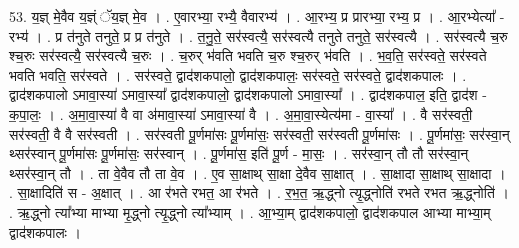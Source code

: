 \documentclass[17pt]{extarticle}
\begin{document}
53. य॒ज्ञ् मे॒वैव य॒ज्ञ्ं ॅय॒ज्ञ् मे॒व । . ए॒वारभ्या॒ रभ्यै॒ वैवारभ्य॑ । . आ॒रभ्य॒ प्र प्रारभ्या॒ रभ्य॒ प्र । . आ॒रभ्येत्या᳚ - रभ्य॑ । . प्र त॑नुते तनुते॒ प्र प्र त॑नुते । . त॒नु॒ते॒ सर॑स्वत्यै॒ सर॑स्वत्यै तनुते तनुते॒ सर॑स्वत्यै । . सर॑स्वत्यै च॒रु श्च॒रुः सर॑स्वत्यै॒ सर॑स्वत्यै च॒रुः । . च॒रुर् भ॑वति भवति च॒रु श्च॒रुर् भ॑वति । . भ॒व॒ति॒ सर॑स्वते॒ सर॑स्वते भवति भवति॒ सर॑स्वते । . सर॑स्वते॒ द्वाद॑शकपालो॒ द्वाद॑शकपालः॒ सर॑स्वते॒ सर॑स्वते॒ द्वाद॑शकपालः । . द्वाद॑शकपालो ऽमावा॒स्या॑ ऽमावा॒स्या᳚ द्वाद॑शकपालो॒ द्वाद॑शकपालो ऽमावा॒स्या᳚ । . द्वाद॑शकपाल॒ इति॒ द्वाद॑श - क॒पा॒लः॒ । . अ॒मा॒वा॒स्या॑ वै वा अ॑मावा॒स्या॑ ऽमावा॒स्या॑ वै । . अ॒मा॒वा॒स्येत्य॑मा - वा॒स्या᳚ । . वै सर॑स्वती॒ सर॑स्वती॒ वै वै सर॑स्वती । . सर॑स्वती पू॒र्णमा॑सः पू॒र्णमा॑सः॒ सर॑स्वती॒ सर॑स्वती पू॒र्णमा॑सः । . पू॒र्णमा॑सः॒ सर॑स्वा॒न् थ्सर॑स्वान् पू॒र्णमा॑सः पू॒र्णमा॑सः॒ सर॑स्वान् । . पू॒र्णमा॑स॒ इति॑ पू॒र्ण - मा॒सः॒ । . सर॑स्वा॒न् तौ तौ सर॑स्वा॒न् थ्सर॑स्वा॒न् तौ । . ता वे॒वैव तौ ता वे॒व । . ए॒व सा॒क्षाथ् सा॒क्षा दे॒वैव सा॒क्षात् । . सा॒क्षादा सा॒क्षाथ् सा॒क्षादा । . सा॒क्षादिति॑ स - अ॒क्षात् । . आ र॑भते रभत॒ आ र॑भते । . र॒भ॒त॒ ऋ॒द्ध्नो त्यृ॒द्ध्नोति॑ रभते रभत ऋ॒द्ध्नोति॑ । . ऋ॒द्ध्नो त्या᳚भ्या माभ्या मृ॒द्ध्नो त्यृ॒द्ध्नो त्या᳚भ्याम् । . आ॒भ्या॒म् द्वाद॑शकपालो॒ द्वाद॑शकपाल आभ्या माभ्या॒म् द्वाद॑शकपालः । \newline
\end{document}
